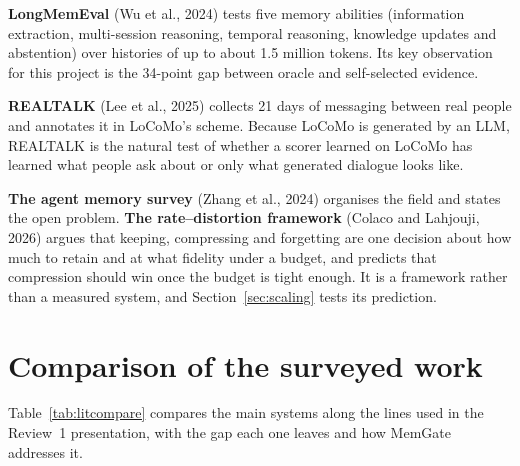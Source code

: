 \textbf{LongMemEval} (Wu et al., 2024) \cite{wu2024longmemeval} tests five
memory abilities (information extraction, multi-session reasoning, temporal
reasoning, knowledge updates and abstention) over histories of up to about
1.5 million tokens. Its key observation for this project is the 34-point gap
between oracle and self-selected evidence.

\textbf{REALTALK} (Lee et al., 2025) \cite{lee2025realtalk} collects 21 days of
messaging between real people and annotates it in LoCoMo's scheme. Because
LoCoMo is generated by an LLM, REALTALK is the natural test of whether a
scorer learned on LoCoMo has learned what people ask about or only what
generated dialogue looks like.

\textbf{The agent memory survey} (Zhang et al., 2024)
\cite{zhang2024memorysurvey} organises the field and states the open
problem. \textbf{The rate--distortion framework} (Colaco and Lahjouji, 2026)
\cite{colaco2026rd} argues that keeping, compressing and forgetting are one
decision about how much to retain and at what fidelity under a budget, and
predicts that compression should win once the budget is tight enough. It is a
framework rather than a measured system, and Section~\ref{sec:scaling} tests
its prediction.

\section{Comparison of the surveyed work}

Table~\ref{tab:litcompare} compares the main systems along the lines used in
the Review~1 presentation, with the gap each one leaves and how MemGate
addresses it.

